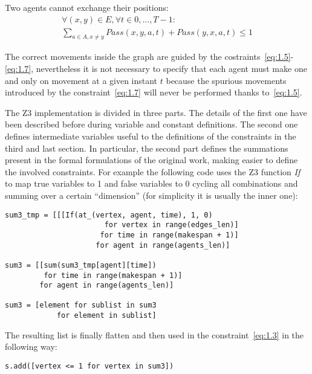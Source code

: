 \documentclass[12pt, a4paper, hidelinks]{article}
\numberwithin{equation}{section}
\begin{document}
\begin{description}
\item Two agents cannot exchange their positions:
\begin{equation}\begin{split}
\forall (x,y) \in E, \forall t \in {0,...,T-1}: \\
\displaystyle\sum_{a \in A, x \neq y}Pass(x,y,a,t) + Pass(y,x,a,t) \leq 1
\end{split}\label{eq:1.7}\end{equation}
\end{description}

The correct movements inside the graph are guided by the costraints~\ref{eq:1.5}-\ref{eq:1.7}, nevertheless it is not necessary to specify that each agent must make one and only on movement at a given instant $t$ because the spurious movements introduced by the constraint~\ref{eq:1.7} will never be performed thanks to~\ref{eq:1.5}.

The Z3 implementation is divided in three parts.
The details of the first one have been described before during variable and constant definitions. 
The second one defines intermediate variables useful to the definitions of the constraints in the third and last section.
In particular, the second part defines the summations present in the formal formulations of the original work, making easier to define the involved constraints.
For example the following code uses the Z3 function \textit{If} to map true variables to 1 and false variables to 0 cycling all combinations and summing over a certain ``dimension'' (for simplicity it is usually the inner one):

\begin{lstlisting}
sum3_tmp = [[[If(at_(vertex, agent, time), 1, 0)
                       for vertex in range(edges_len)]
                      for time in range(makespan + 1)]
                     for agent in range(agents_len)]

sum3 = [[sum(sum3_tmp[agent][time])
         for time in range(makespan + 1)]
        for agent in range(agents_len)]

sum3 = [element for sublist in sum3 
            for element in sublist]
\end{lstlisting}\label{code:1.3.1}

The resulting list is finally flatten and then used in the constraint~\ref{eq:1.3} in the following way:

\begin{lstlisting}
s.add([vertex <= 1 for vertex in sum3])
\end{lstlisting}\label{code:1.3.2}
\end{document}
